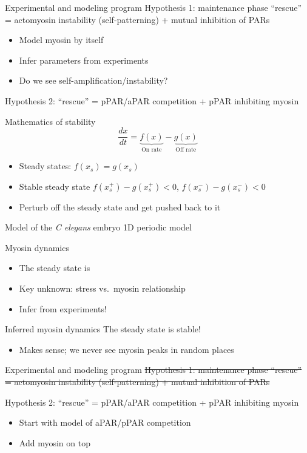 \documentclass{beamer}
\newcommand{\6}[1]{#1_{\text{6}}}
\newcommand{\3}[1]{#1_{\text{3}}}
\begin{document}
\begin{frame}{Experimental and modeling program}
Hypothesis 1: maintenance phase ``rescue'' = actomyosin instability (self-patterning) + mutual inhibition of PARs
\begin{itemize}
\item Model myosin by itself
\item Infer parameters from experiments
\item Do we see self-amplification/instability?
\end{itemize}
Hypothesis 2: ``rescue'' = pPAR/aPAR competition + pPAR inhibiting myosin 
\end{frame}

\begin{frame}{Mathematics of stability}
$$\frac{dx}{dt}=\underbrace{f(x)}_\text{On rate}-\underbrace{g(x)}_\text{Off rate}$$
\begin{itemize}
\item Steady states: $f(x_s)=g(x_s)$
\item Stable steady state $f(x_s^+)-g(x_s^+) < 0$,  $f(x_s^-)-g(x_s^-) < 0$
\item Perturb off the steady state and get pushed back to it
\end{itemize}
\end{frame}

\begin{frame}{Model of the \emph{C elegans} embryo}
1D periodic model

\end{frame}

\begin{frame}{Myosin dynamics}
\begin{itemize}
\item The steady state is
\item Key unknown: stress vs.\ myosin relationship 
\item Infer from experiments!
\end{itemize}
\end{frame}

\begin{frame}{Inferred myosin dynamics}
The steady state is stable!
\begin{itemize}
\item Makes sense; we never see myosin peaks in random places
\end{itemize}
\end{frame}

\begin{frame}{Experimental and modeling program}
\st{Hypothesis 1: maintenance phase ``rescue'' = actomyosin instability (self-patterning) + mutual inhibition of PARs}

\vspace{0.5 cm}

Hypothesis 2: ``rescue'' = pPAR/aPAR competition + pPAR inhibiting myosin 
\begin{itemize}
\item Start with model of aPAR/pPAR competition
\item Add myosin on top
\end{itemize}
\end{frame}
\end{document}
